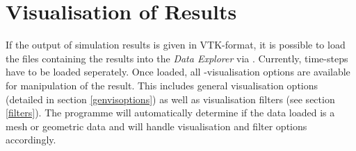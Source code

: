 %
%


\section{Visualisation of Results}

If the output of simulation results is given in VTK-format, it is possible to load the files containing the results into the \emph{Data Explorer} via . Currently, time-steps have to be loaded seperately. Once loaded, all \ogs-visualisation options are available for manipulation of the result. This includes general visualisation options (detailed in section \ref{genvisoptions}) as well as visualisation filters (see section \ref{filters}).
The programme will automatically determine if the data loaded is a mesh or geometric data and will handle visualisation and filter options accordingly.
